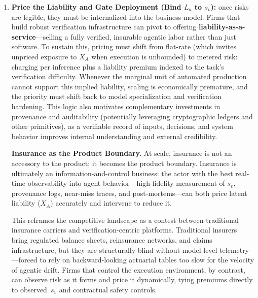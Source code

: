 \documentclass[12pt, letter]{article}
\begin{document}
\begin{enumerate}
This independence constraint also shapes model supply strategy. Firms that ride open-weight progress can treat frontier capability as a commodity input and compete by owning the wrapper: proprietary $K_{IP}^{ver}$, evaluation harnesses, monitoring, and governance, swapping in better open models as they arrive while keeping the trust layer in-house. Firms that build proprietary models accept higher fixed costs in exchange for tighter control over failure modes, data governance, and update cadence—often necessary when warranties, regulators, or customers demand a stable and auditable system boundary. In many high-stakes settings, the dominant design is a hybrid and heterogeneous stack: open models for broad execution, specialized proprietary components for safety-critical sub-tasks, and diversified model lineages for verification, since heterogeneity is one of the few levers that reduces correlated error when $L_a$ scales.

\item \textbf{Price the Liability and Gate Deployment (Bind $L_a$ to $s_v$):} once risks are legible, they must be internalized into the business model. Firms that build robust verification infrastructure can pivot to offering \textbf{liability-as-a-service}—selling a fully verified, insurable agentic labor rather than just software. To sustain this, pricing must shift from flat-rate (which invites unpriced exposure to $X_A$ when execution is unbounded) to metered risk: charging per inference plus a liability premium indexed to the task's verification difficulty. Whenever the marginal unit of automated production cannot support this implied liability, scaling is economically premature, and the priority must shift back to model specialization and verification hardening. This logic also motivates complementary investments in provenance and auditability (potentially leveraging cryptographic ledgers and other primitives), as a verifiable record of inputs, decisions, and system behavior improves internal understanding and external credibility. 

\textbf{Insurance as the Product Boundary.} At scale, insurance is not an accessory to the product; it becomes the product boundary. Insurance is ultimately an information-and-control business: the actor with the best real-time observability into agent behavior—high-fidelity measurement of $s_v$, provenance logs, near-miss traces, and post-mortems—can both price latent liability ($X_A$) accurately and intervene to reduce it.

This reframes the competitive landscape as a contest between traditional insurance carriers and verification-centric platforms. Traditional insurers bring regulated balance sheets, reinsurance networks, and claims infrastructure, but they are structurally blind without model-level telemetry---forced to rely on backward-looking actuarial tables too slow for the velocity of agentic drift. Firms that control the execution environment, by contrast, can observe risk as it forms and price it dynamically, tying premiums directly to observed~$s_v$ and contractual safety controls.


\end{enumerate}
\end{document}

